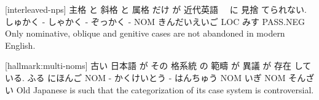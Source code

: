 [interleaved-nps]
主格    と 斜格   と 属格    だけ が 近代英語　     に  見捨 てられない.
しゅかく - しゃかく - ぞっかく -  NOM きんだいえいご LOC みす PASS.NEG
Only nominative, oblique and genitive cases are not abandoned in modern English.

[hallmark:multi-noms]
古い 日本語   が  その 格系統     の 範疇      が   異議 が  存在 している.
ふる にほんご NOM -   かくけいとう - はんちゅう NOM いぎ NOM そんざい
Old Japanese is such that the categorization of its case system is controversial.
